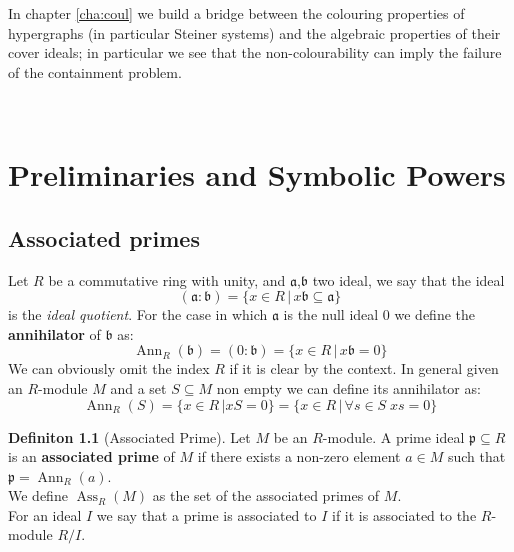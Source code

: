 \documentclass[notitlepage, a4]{book}
\theoremstyle{plain}
\theoremstyle{remark}
\theoremstyle{definition}
\newtheorem{deff}[teo]{Definiton}
\newcommand{\p}{\mathfrak{p}}
\newcommand{\A}{\mathfrak{a}}
\newcommand{\B}{\mathfrak{b}}
\DeclareMathOperator{\Ann}{Ann}
\DeclareMathOperator{\Ass}{Ass}
\begin{document}
In chapter \ref{cha:coul} we build a bridge between the colouring properties of hypergraphs (in particular Steiner systems) and the algebraic properties of their cover ideals; in particular we see that the non-colourability can imply the failure of the containment problem. 

  

\mainmatter



\chapter{Preliminaries and Symbolic Powers} \label{cha:pre_sym}


\section{Associated primes}

Let $ R $ be a commutative ring with unity, and $ \A $,$ \B $ two ideal, we say that the ideal
\begin{equation*}
	(\A : \B) = \{ x \in R \,|\, x\B \subseteq \A  \}
\end{equation*}
 \nocite{AMCD}
is the \textit{ideal quotient}. For the case in which $ \A $  is the null ideal $ 0 $ we define the \textbf{annihilator} of $ \B $ as:
\begin{equation*}
	\Ann_R(\B) = (0 : \B) = \{ x \in R \,|\, x\B = 0  \}
\end{equation*}
We can obviously omit the index $ R $ if it is clear by the context. In general given an $ R  $-module $ M $ and a set $ S \subseteq M $ non empty we can define its annihilator as:
\begin{equation*}
	\Ann_R (S) = \{ x \in R \,| xS = 0  \} = \{ x \in R \,|\, \forall s \in S \; xs = 0  \}
\end{equation*}

\begin{deff}[Associated Prime]
Let $ M $ be an $ R $-module. A prime ideal $ \p \subseteq R $ is an \textbf{associated prime} of $ M $ if there exists a non-zero element $ a \in M $ such that $ \p = \Ann_R (a)$. \\
We define $ \Ass_R(M) $ as the set of the associated primes of $ M $.\\
For an ideal $ I $ we say that a prime is associated to $ I $ if it is associated to the $ R $-module $ R/I $.
\end{deff}
\end{document}
